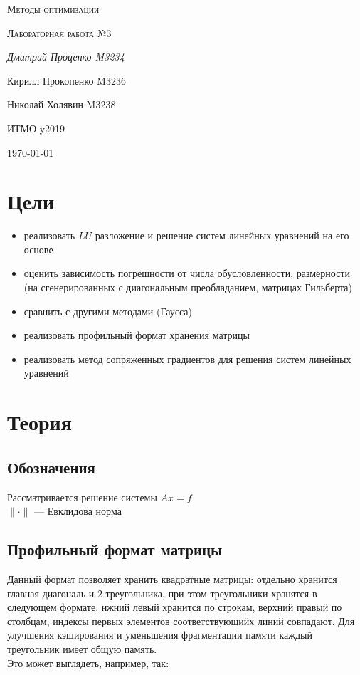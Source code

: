 \documentclass[russian, english]{article}
\begin{document}
\begin{titlepage}
\centering
	{\scshape\LARGE Методы оптимизации \par}
	\vspace{1cm}
	{\scshape\Large Лабораторная работа №3\par}
	\vspace{2cm}
	{\Large\itshape Дмитрий Проценко M3234 \par
	Кирилл Прокопенко M3236 \par
	Николай Холявин M3238 \par}
	\vfill
	ИТМО y2019
	\vfill
	{\large \today\par}
\end{titlepage}

\tableofcontents
\newpage

\section{Цели}
\begin{itemize}
	\item реализовать $LU$ разложение и решение систем линейных уравнений на его основе
	\item оценить зависимость погрешности от числа обусловленности, размерности (на сгенерированных с диагональным преобладанием, матрицах Гильберта)
	\item сравнить с другими методами (Гаусса)
	\item реализовать профильный формат хранения матрицы
	\item реализовать метод сопряженных градиентов для решения систем линейных уравнений
\end{itemize}
\section{Теория}
\subsection{Обозначения}
Рассматривается решение системы $Ax=f$ \\
$\|\cdot\|$ --- Евклидова норма
\subsection{Профильный формат матрицы}
Данный формат позволяет хранить квадратные матрицы: отдельно хранится главная диагональ и 2 треугольника, при этом треугольники хранятся в следующем формате: нжний левый хранится по строкам, верхний правый по столбцам, индексы первых элементов соответствующийх линий совпадают. Для улучшения кэширования и уменьшения фрагментации памяти каждый треугольник имеет общую память.\\
Это может выглядеть, например, так:
\end{document}
